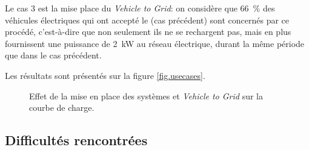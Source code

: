 				Le cas 3 est la mise place du \emph{Vehicle to Grid}: on considère que \SI{66}{\percent} des véhicules électriques qui ont accepté le \smartgrid{} (cas précédent) sont concernés par ce procédé, c'est-à-dire que non seulement ils ne se rechargent pas, mais en plus fournissent une puissance de \SI{2}{\kilo\watt} au réseau électrique, durant la même période que dans le cas précédent.
				
				Les résultats sont présentés sur la figure \vref{fig.usecases}.
				
				\begin{figure}[!h]
					\centering
					\caption{Effet de la mise en place des systèmes \smartgrid{} et \emph{Vehicle to Grid} sur la courbe de charge. \label{fig.usecases}}
				\end{figure}
				
				

				
				
			
		\subsection{Difficultés rencontrées}
		
		
